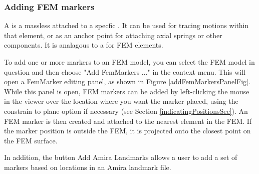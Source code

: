 \documentclass{article}
\begin{document}
\subsubsection{Adding FEM markers}
\label{addingFemMarkersSec}

A  is a massless 
 attached to a
specfic . 
It can be used for tracing motions within that element,
or as an anchor point for attaching axial
springs or other components. It is analagous to 
a  for
FEM elements.

To add one or more markers to an FEM model, you can select the FEM
model in question and then choose {\sf "Add FemMarkers ..."} in the context
menu. This will open a FemMarker editing panel, as shown in
Figure \ref{addFemMarkersPanelFig}. While this panel is open, FEM markers can be
added by left-clicking the mouse in the viewer over the location where
you want the marker placed, using the {\sf constrain to plane} option if
necessary (see Section \ref{indicatingPositionsSec}). 
An FEM marker is then created
and attached to the nearest element in the FEM. If the marker position
is outside the FEM, it is projected onto the closest point on the FEM
surface.

In addition, the button {\sf Add Amira Landmarks} allows a user to add a
set of markers based on locations in an Amira landmark file.
\end{document}
